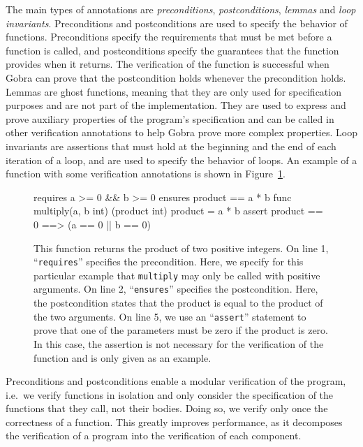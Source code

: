 The main types of annotations are \emph{preconditions}, \emph{postconditions}, \emph{lemmas} and \emph{loop invariants}.
Preconditions and postconditions are used to specify the behavior of functions. Preconditions specify the requirements that must be met before a function is called, and postconditions specify the guarantees that the function provides when it returns.
The verification of the function is successful when Gobra can prove that the postcondition holds whenever the precondition holds.
Lemmas are ghost functions, meaning that they are only used for specification purposes and are not part of the implementation.
They are used to express and prove auxiliary properties of the program's specification and can be called in other verification annotations to help Gobra prove more complex properties.
Loop invariants are assertions that must hold at the beginning and the end of each iteration of a loop, and are used to specify the behavior of loops.
An example of a function with some verification annotations is shown in Figure~\ref{lst:multiply-example}.

\begin{figure}
    \begin{gobra}
requires a >= 0 && b >= 0
ensures  product == a * b
func multiply(a, b int) (product int) {
    product = a * b
    assert product == 0 ==> (a == 0 || b == 0)
}
    \end{gobra}
    \caption{This function returns the product of two positive integers. On line 1, “\texttt{requires}” specifies the precondition. Here, we specify for this particular example that \texttt{multiply} may only be called with positive arguments. On line 2, “\texttt{ensures}” specifies the postcondition. Here, the postcondition states that the product is equal to the product of the two arguments. On line 5, we use an “\texttt{assert}” statement to prove that one of the parameters must be zero if the product is zero. In this case, the assertion is not necessary for the verification of the function and is only given as an example.}
    \label{lst:multiply-example}
\end{figure}

Preconditions and postconditions enable a modular verification of the program, i.e.\ we verify functions in isolation and only consider the specification of the functions that they call, not their bodies.
Doing so, we verify only once the correctness of a function.
This greatly improves performance, as it decomposes the verification of a program into the verification of each component.

